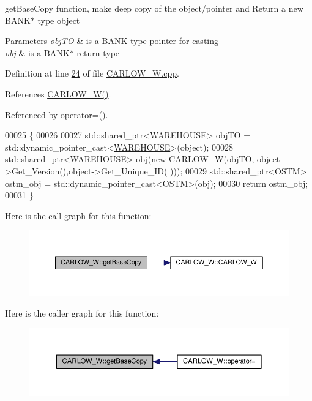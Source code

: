 get\+Base\+Copy function, make deep copy of the object/pointer and Return a new B\+A\+N\+K$\ast$ type object 


\begin{DoxyParams}{Parameters}
{\em obj\+TO} & is a \hyperlink{class_b_a_n_k}{B\+A\+NK} type pointer for casting \\
\hline
{\em obj} & is a B\+A\+N\+K$\ast$ return type \\
\hline
\end{DoxyParams}


Definition at line \hyperlink{_c_a_r_l_o_w___w_8cpp_source_l00024}{24} of file \hyperlink{_c_a_r_l_o_w___w_8cpp_source}{C\+A\+R\+L\+O\+W\+\_\+\+W.\+cpp}.



References \hyperlink{_c_a_r_l_o_w___w_8h_source_l00024}{C\+A\+R\+L\+O\+W\+\_\+\+W()}.



Referenced by \hyperlink{_c_a_r_l_o_w___w_8h_source_l00075}{operator=()}.


\begin{DoxyCode}
00025 \{
00026 
00027     std::shared\_ptr<WAREHOUSE> objTO = std::dynamic\_pointer\_cast<\hyperlink{class_w_a_r_e_h_o_u_s_e}{WAREHOUSE}>(object);
00028     std::shared\_ptr<WAREHOUSE> obj(\textcolor{keyword}{new} \hyperlink{class_c_a_r_l_o_w___w_a8ae6ca6f4db7ea5240322fd27824c55a}{CARLOW\_W}(objTO, object->Get\_Version(),\textcolor{keywordtype}{object}->Get\_Unique\_ID(
      )));
00029     std::shared\_ptr<OSTM> ostm\_obj = std::dynamic\_pointer\_cast<OSTM>(obj);
00030     \textcolor{keywordflow}{return} ostm\_obj;
00031 \}
\end{DoxyCode}


Here is the call graph for this function\+:\nopagebreak
\begin{figure}[H]
\begin{center}
\leavevmode
\includegraphics[width=350pt]{class_c_a_r_l_o_w___w_a1a76566c3a7c01cf469007741dac6b97_cgraph}
\end{center}
\end{figure}




Here is the caller graph for this function\+:\nopagebreak
\begin{figure}[H]
\begin{center}
\leavevmode
\includegraphics[width=350pt]{class_c_a_r_l_o_w___w_a1a76566c3a7c01cf469007741dac6b97_icgraph}
\end{center}
\end{figure}


